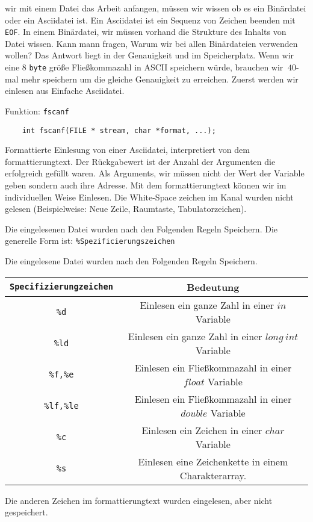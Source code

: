 wir mit einem Datei das Arbeit anfangen, müssen wir wissen ob es ein Binärdatei oder ein Asciidatei
ist. Ein Asciidatei ist ein Sequenz von Zeichen beenden mit \texttt{EOF}. In einem Binärdatei, wir müssen vorhand
die Strukture des Inhalts von Datei wissen. Kann mann fragen, Warum wir bei allen Binärdateien verwenden wollen?
Das Antwort liegt in der Genauigkeit und im Speicherplatz. Wenn wir eine 8 \texttt{byte} größe Fließkommazahl in 
ASCII speichern würde, brauchen wir $~40$-mal mehr speichern um die gleiche Genauigkeit zu erreichen. Zuerst 
werden wir einlesen aus Einfache Asciidatei.
\begin{myexampleblock}{Funktion: \texttt{fscanf}}
  \begin{lstlisting}
    int fscanf(FILE * stream, char *format, ...);
  \end{lstlisting}
  \vspace{-0.4cm}
  Formattierte Einlesung von einer Asciidatei, interpretiert von dem formattierungtext. Der Rückgabewert ist der
  Anzahl der Argumenten die erfolgreich gefüllt waren. Als Arguments, wir müssen nicht der Wert der Variable geben
  sondern auch ihre Adresse. Mit dem formattierungtext können wir im individuellen Weise Einlesen.
  Die White-Space zeichen im Kanal wurden nicht gelesen (Beispielweise: Neue Zeile, Raumtaste, Tabulatorzeichen).
  
  Die eingelesenen Datei wurden nach den Folgenden Regeln Speichern. Die generelle Form ist:
  \texttt{\%Spezificierungszeichen}
  
Die eingelesene Datei wurden nach den Folgenden Regeln Speichern. 

\begin{center}
\begin{tabular}{|cc|}
\hline
\texttt{Specifizierungzeichen} & Bedeutung \\\hline
\texttt{\%d}	&  Einlesen ein ganze Zahl in einer $in$ Variable \\
\texttt{\%ld}  &  Einlesen ein ganze Zahl in einer $long~int$ Variable \\
\texttt{\%f,\%e}   & Einlesen ein Fließkommazahl in einer $float$ Variable \\
\texttt{\%lf,\%le}  & Einlesen ein Fließkommazahl in einer $double$ Variable \\
\texttt{\%c}  & Einlesen ein Zeichen in einer $char$ Variable \\
\texttt{\%s}  & Einlesen eine Zeichenkette in einem Charakterarray.\\
\hline
\end{tabular}
\end{center}

Die anderen Zeichen im formattierungtext wurden eingelesen, aber nicht gespeichert. 
\end{myexampleblock}
